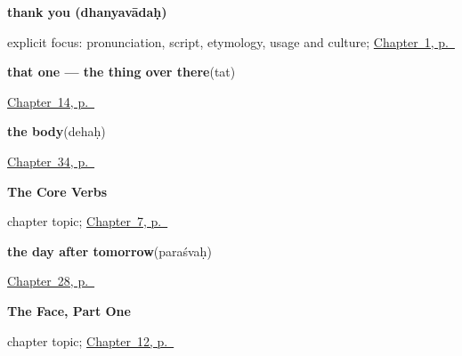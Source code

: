 \noindent\begin{minipage}[t]{\linewidth}
\raggedright
\textbf{thank you (dhanyavādaḥ)}\enspace\emph{}\par
\footnotesize explicit focus: pronunciation, script, etymology, usage and culture; \hyperref[ch:greetings]{Chapter~1, p.~\pageref*{ch:greetings}}
\end{minipage}\par\smallskip

\noindent\begin{minipage}[t]{\linewidth}
\raggedright
\textbf{that one — the thing over there}\enspace\emph{}\enspace(tat)\par
\footnotesize \hyperref[ch:sa-pointing-and-asking]{Chapter~14, p.~\pageref*{ch:sa-pointing-and-asking}}
\end{minipage}\par\smallskip

\noindent\begin{minipage}[t]{\linewidth}
\raggedright
\textbf{the body}\enspace\emph{}\enspace(dehaḥ)\par
\footnotesize \hyperref[ch:sa-limbs]{Chapter~34, p.~\pageref*{ch:sa-limbs}}
\end{minipage}\par\smallskip

\noindent\begin{minipage}[t]{\linewidth}
\raggedright
\textbf{The Core Verbs}\par
\footnotesize chapter topic; \hyperref[ch:sa-core-verbs]{Chapter~7, p.~\pageref*{ch:sa-core-verbs}}
\end{minipage}\par\smallskip

\noindent\begin{minipage}[t]{\linewidth}
\raggedright
\textbf{the day after tomorrow}\enspace\emph{}\enspace(paraśvaḥ)\par
\footnotesize \hyperref[ch:sa-leave-more]{Chapter~28, p.~\pageref*{ch:sa-leave-more}}
\end{minipage}\par\smallskip

\noindent\begin{minipage}[t]{\linewidth}
\raggedright
\textbf{The Face, Part One}\par
\footnotesize chapter topic; \hyperref[ch:sa-face-nouns-1]{Chapter~12, p.~\pageref*{ch:sa-face-nouns-1}}
\end{minipage}\par\smallskip

